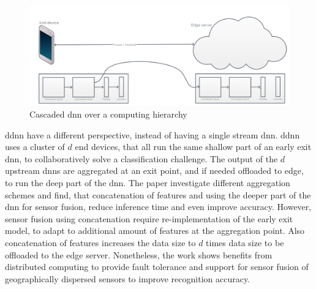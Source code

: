 \begin{figure}
	\centering
	\includegraphics[width=\linewidth]{figures/models/cascaded}
	\caption[Cascaded \gls{dnn} over a computing hierarchy]{Cascaded \gls{dnn} over a computing hierarchy}
	\label{fig:early-exit-colab}
\end{figure}

\gls{ddnn} \cite{teerapittayanon_distributed_2017} have a different perspective, instead of having a single stream \gls{dnn}. \gls{ddnn} uses a cluster of $d$ end devices, that all run the same shallow part of an early exit \gls{dnn}, to collaboratively solve a classification challenge. The output of the $ d $ upstream \gls{dnn}s are aggregated at an exit point, and if needed offloaded to edge, to run the deep part of the \gls{dnn}. The paper investigate different aggregation schemes and find, that concatenation of features and using the deeper part of the \gls{dnn} for sensor fusion, reduce inference time and even improve accuracy. However, sensor fusion using concatenation require re-implementation of the early exit model, to adapt to additional amount of features at the aggregation point. Also concatenation of features increases the data size to $ d $ times data size to be offloaded to the edge server. Nonetheless, the work shows benefits from distributed computing to provide fault tolerance and support for sensor fusion of geographically dispersed sensors to improve recognition accuracy. 

